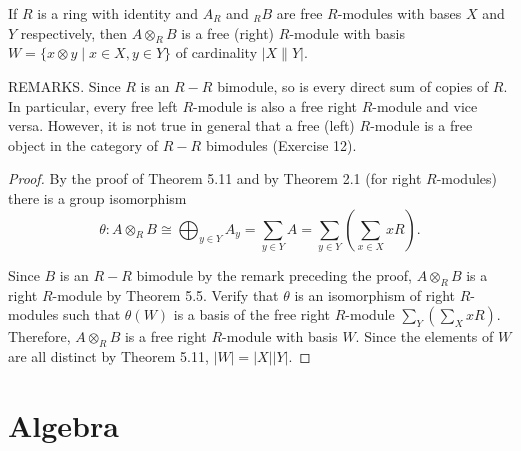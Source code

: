 \begin{corollary}
    If $R$ is a ring with identity and ${A}_{{R}}$ and ${ }_{{R}} B$ are free $R$-modules with bases $X$ and $Y$ respectively, then ${A} \otimes_{{R}} B$ is a free (right) $R$-module with basis ${W}=\{{x} \otimes {y} \mid {x} \in {X}, {y} \in {Y}\}$ of cardinality $|{X} \| {Y}|$.

    REMARKS. Since $R$ is an $R-R$ bimodule, so is every direct sum of copies of $R$. In particular, every free left $R$-module is also a free right $R$-module and vice versa. However, it is not true in general that a free (left) $R$-module is a free object in the category of $R-R$ bimodules (Exercise 12).

    \begin{proof}
        By the proof of Theorem 5.11 and by Theorem 2.1 (for right $R$-modules) there is a group isomorphism
        \begin{equation*}
            \theta: A \otimes_R B \cong \bigoplus_{y \in Y} A_y=\sum_{y \in Y} A=\sum_{y \in Y}\left(\sum_{x \in X} x R\right) .
        \end{equation*}

        Since $B$ is an $R-R$ bimodule by the remark preceding the proof, $A \otimes_R B$ is a right $R$-module by Theorem 5.5. Verify that $\theta$ is an isomorphism of right $R$-modules such that $\theta(W)$ is a basis of the free right $R$-module $\sum_Y\left(\sum_X x R\right)$. Therefore, $A \otimes_R B$ is a free right $R$-module with basis $W$. Since the elements of $W$ are all distinct by Theorem 5.11, $|W|=|X||Y|$.
    \end{proof}
\end{corollary}







































\section{Algebra} %

